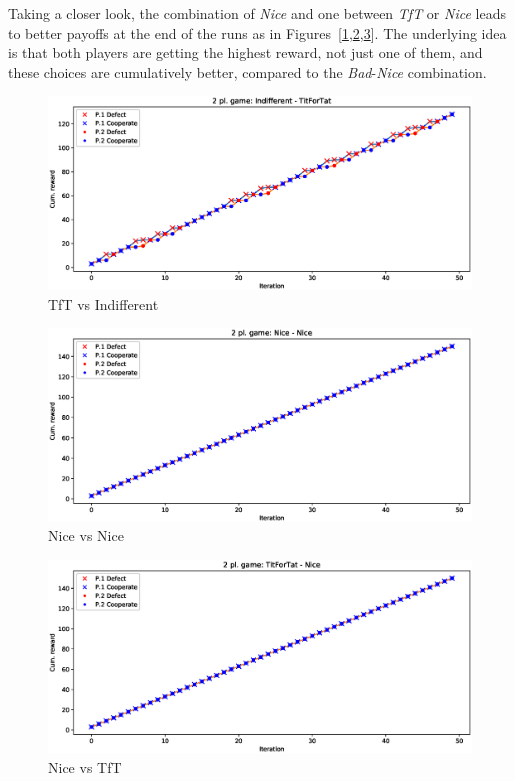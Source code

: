 \documentclass[journal,10pt,twoside]{IEEEtran}
\begin{document}
Taking a closer look, the combination of \textit{Nice} and one between \textit{TfT} or \textit{Nice} leads to better payoffs at the end of the runs as in Figures~[\ref{fig:tftvsindiff},\ref{fig:nicevsnice},\ref{fig:nicevstft}]. The underlying idea is that both players are getting the highest reward, not just one of them, and these choices are cumulatively better, compared to the \textit{Bad}-\textit{Nice} combination.

\begin{figure}[!ht]
    \centering
    \includegraphics[width=1\columnwidth]{../img/ipd2p/ipd2p-rewards-Indifferent-TitForTat}
    \caption{TfT vs Indifferent}
    \label{fig:tftvsindiff}
\end{figure}

\begin{figure}[!ht]
    \centering
    \includegraphics[width=1\columnwidth]{../img/ipd2p/ipd2p-rewards-Nice-Nice}
    \caption{Nice vs Nice}
    \label{fig:nicevsnice}
\end{figure}

\begin{figure}[!ht]
    \centering
    \includegraphics[width=1\columnwidth]{../img/ipd2p/ipd2p-rewards-TitForTat-Nice}
    \caption{Nice vs TfT}
    \label{fig:nicevstft}
\end{figure}
\end{document}
